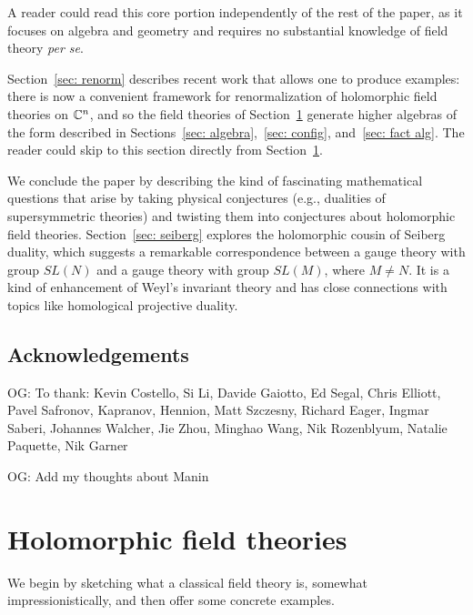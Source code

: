 \documentclass[11pt]{amsart}
\def\owen#1{{\textcolor{violet!50!black}{OG: {#1}}}}
\begin{document}
A reader could read this core portion independently of the rest of the paper,
as it focuses on algebra and geometry and requires no substantial knowledge of field theory {\it per se}.

Section~\ref{sec: renorm} describes recent work that allows one to produce examples:
there is now a convenient framework for renormalization of holomorphic field theories on $\mathbb C^n$,
and so the field theories of Section~\ref{sec: HFT} generate higher algebras of the form described in Sections~\ref{sec: algebra},~\ref{sec: config}, and~\ref{sec: fact alg}.
The reader could skip to this section directly from Section~\ref{sec: HFT}.

We conclude the paper by describing the kind of fascinating mathematical questions
that arise by taking physical conjectures (e.g., dualities of supersymmetric theories) and twisting them into conjectures about holomorphic field theories. 
Section~\ref{sec: seiberg} explores the holomorphic cousin of Seiberg duality,
which suggests a remarkable correspondence between a gauge theory with group $SL(N)$ and a gauge theory with group $SL(M)$, where $M \neq N$.
It is a kind of enhancement of Weyl's invariant theory and has close connections with topics like homological projective duality.


\subsection{Acknowledgements}

\owen{To thank: Kevin Costello, Si Li, Davide Gaiotto, Ed Segal, Chris Elliott, Pavel Safronov, Kapranov, Hennion, Matt Szczesny, Richard Eager, Ingmar Saberi, Johannes Walcher, Jie Zhou, Minghao Wang, Nik Rozenblyum, Natalie Paquette, Nik Garner}

\owen{Add my thoughts about Manin}

\section{Holomorphic field theories}
\label{sec: HFT}

We begin by sketching what a classical field theory is, somewhat impressionistically, and then offer some concrete examples.
\end{document}
